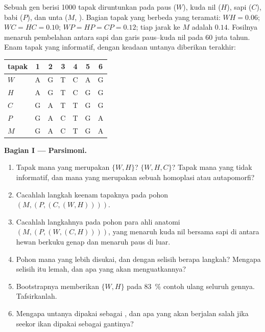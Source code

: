\begin{problem}
\label{pb:b2:phylogenetic-trees:1}
Sebuah gen berisi \num{1000} tapak diruntunkan pada paus ($W$), kuda
nil ($H$), sapi ($C$), babi ($P$), dan unta ($M$, ).
Bagian tapak yang berbeda yang teramati: $WH = 0.06$; $WC = HC = 0.10$; $WP =
HP = CP = 0.12$; tiap jarak ke $M$ adalah $0.14$. Fosilnya
menaruh pembelahan antara sapi dan garis paus--kuda nil pada 60 juta
tahun. Enam tapak yang informatif, dengan keadaan untanya diberikan
terakhir:
\begin{center}
\begin{tabular}{l@{\quad}cccccc}
tapak & 1 & 2 & 3 & 4 & 5 & 6 \\ \hline
$W$ & A & G & T & C & A & G \\
$H$ & A & G & T & C & G & G \\
$C$ & G & A & T & T & G & G \\
$P$ & G & A & C & T & G & A \\
$M$ & G & A & C & T & G & A \\
\end{tabular}
\end{center}

\medskip
\noindent\textbf{Bagian I --- Parsimoni.}
\begin{enumerate}
  \item Tapak mana yang merupakan  $\{W, H\}$?  $\{W, H,
        C\}$? Tapak mana yang tidak informatif, dan mana yang
        merupakan sebuah homoplasi atau autapomorfi?
  \item Cacahlah langkah keenam tapaknya pada pohon
        $(M,(P,(C,(W,H))))$.
  \item Cacahlah langkahnya pada pohon para ahli anatomi
        $(M,(P,(W,(C,H))))$, yang menaruh kuda nil bersama sapi di
        antara hewan berkuku genap dan menaruh paus di luar.
  \item Pohon mana yang lebih disukai, dan dengan selisih berapa
        langkah? Mengapa selisih itu lemah, dan apa yang akan
        menguatkannya?
  \item Bootstrapnya memberikan  $\{W, H\}$ pada \qty{83}{\%}
        contoh ulang seluruh gennya. Tafsirkanlah.
  \item Mengapa untanya dipakai sebagai , dan apa yang
        akan berjalan salah jika seekor ikan dipakai sebagai gantinya?
\end{enumerate}


\end{problem}
